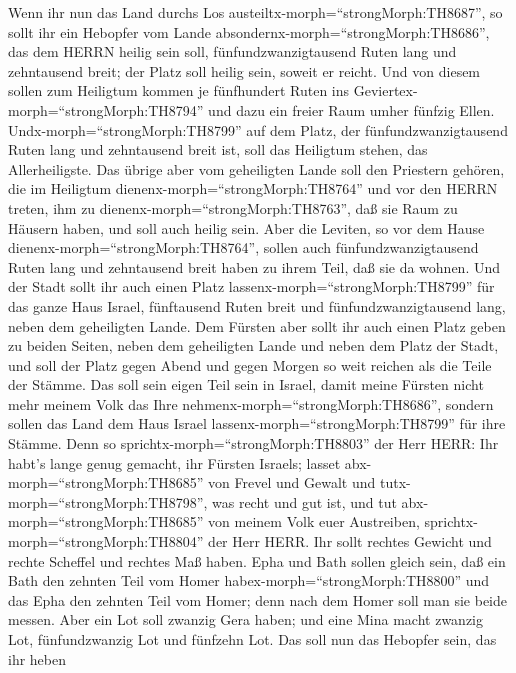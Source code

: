  Wenn ihr nun das Land durchs Los
austeiltx-morph=``strongMorph:TH8687'', so sollt ihr ein Hebopfer vom
Lande absondernx-morph=``strongMorph:TH8686'', das dem HERRN heilig sein
soll, fünfundzwanzigtausend Ruten lang und zehntausend breit; der Platz
soll heilig sein, soweit er reicht.  Und von diesem sollen
zum Heiligtum kommen je fünfhundert Ruten ins
Geviertex-morph=``strongMorph:TH8794'' und dazu ein freier Raum umher
fünfzig Ellen.  Undx-morph=``strongMorph:TH8799'' auf dem
Platz, der fünfundzwanzigtausend Ruten lang und zehntausend breit ist,
soll das Heiligtum stehen, das Allerheiligste.  Das übrige
aber vom geheiligten Lande soll den Priestern gehören, die im Heiligtum
dienenx-morph=``strongMorph:TH8764'' und vor den HERRN treten, ihm zu
dienenx-morph=``strongMorph:TH8763'', daß sie Raum zu Häusern haben, und
soll auch heilig sein.  Aber die Leviten, so vor dem Hause
dienenx-morph=``strongMorph:TH8764'', sollen auch fünfundzwanzigtausend
Ruten lang und zehntausend breit haben zu ihrem Teil, daß sie da wohnen.
 Und der Stadt sollt ihr auch einen Platz
lassenx-morph=``strongMorph:TH8799'' für das ganze Haus Israel,
fünftausend Ruten breit und fünfundzwanzigtausend lang, neben dem
geheiligten Lande.  Dem Fürsten aber sollt ihr auch einen
Platz geben zu beiden Seiten, neben dem geheiligten Lande und neben dem
Platz der Stadt, und soll der Platz gegen Abend und gegen Morgen so weit
reichen als die Teile der Stämme.  Das soll sein eigen Teil
sein in Israel, damit meine Fürsten nicht mehr meinem Volk das Ihre
nehmenx-morph=``strongMorph:TH8686'', sondern sollen das Land dem Haus
Israel lassenx-morph=``strongMorph:TH8799'' für ihre Stämme.
 Denn so sprichtx-morph=``strongMorph:TH8803'' der Herr
HERR: Ihr habt's lange genug gemacht, ihr Fürsten Israels; lasset
abx-morph=``strongMorph:TH8685'' von Frevel und Gewalt und
tutx-morph=``strongMorph:TH8798'', was recht und gut ist, und tut
abx-morph=``strongMorph:TH8685'' von meinem Volk euer Austreiben,
sprichtx-morph=``strongMorph:TH8804'' der Herr HERR.  Ihr
sollt rechtes Gewicht und rechte Scheffel und rechtes Maß haben.
 Epha und Bath sollen gleich sein, daß ein Bath den zehnten
Teil vom Homer habex-morph=``strongMorph:TH8800'' und das Epha den
zehnten Teil vom Homer; denn nach dem Homer soll man sie beide messen.
 Aber ein Lot soll zwanzig Gera haben; und eine Mina macht
zwanzig Lot, fünfundzwanzig Lot und fünfzehn Lot.  Das soll
nun das Hebopfer sein, das ihr heben
